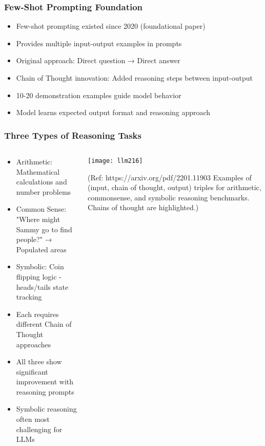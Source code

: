 \begin{frame}[fragile]\frametitle{Few-Shot Prompting Foundation}

      \begin{itemize}
        \item Few-shot prompting existed since 2020 (foundational paper)
        \item Provides multiple input-output examples in prompts
        \item Original approach: Direct question → Direct answer
        \item Chain of Thought innovation: Added reasoning steps between input-output
        \item 10-20 demonstration examples guide model behavior
        \item Model learns expected output format and reasoning approach
      \end{itemize}

\end{frame}

\begin{frame}[fragile]\frametitle{Three Types of Reasoning Tasks}
\begin{columns}
    \begin{column}[T]{0.6\linewidth}
      \begin{itemize}
        \item Arithmetic: Mathematical calculations and number problems
        \item Common Sense: "Where might Sammy go to find people?" → Populated areas
        \item Symbolic: Coin flipping logic - heads/tails state tracking
        \item Each requires different Chain of Thought approaches
        \item All three show significant improvement with reasoning prompts
        \item Symbolic reasoning often most challenging for LLMs
      \end{itemize}
    \end{column}
    \begin{column}[T]{0.4\linewidth}
        \begin{center}
        \texttt{[image: llm216]}
		
		{\tiny (Ref: https://arxiv.org/pdf/2201.11903 Examples of (input, chain of thought, output) triples for arithmetic, commonsense, and
symbolic reasoning benchmarks. Chains of thought are highlighted.)}
        \end{center}	
    \end{column}
  \end{columns}
\end{frame}

